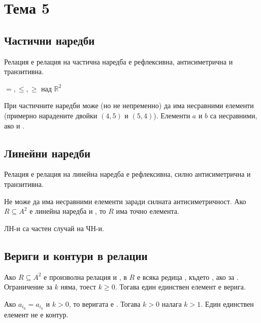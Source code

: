 \section{Тема 5} %

\subsection{Частични наредби}
\begin{definition}
    Релация е релация на частична наредба \totw е рефлексивна, антисиметрична и транзитивна.
\end{definition}

\begin{example}
    \(=, \le, \ge\) над \(\mathbb{R}^2\)
\end{example}

При частичните наредби може (но не непременно) да има несравними елементи (примерно нарадените двойки 
\((4, 5)\) и \((5, 4)\)). Елементи \(a\) и \(b\) са несравними, ако  и .

\subsection{Линейни наредби}
\begin{definition}
    Релация е релация на линейна наредба \totw е рефлексивна, силно антисиметрична и транзитивна.
\end{definition}

Не може да има несравними елементи заради силната антисиметричност.
Ако \(R \subseteq A^2\) е линейна наредба и , то \(R\) има точно 
 елемента.

ЛН-и са частен случай на ЧН-и.

\subsection{Вериги и контури в релации}
Ако \(R \subseteq A^2\) е произволна релация и ,  в \(R\) е всяка
редица , където , ако 
 за . Ограничение за \(k\) няма, тоест \(k \ge 0\). 
Тогава един единствен елемент е верига.

Ако \(a_{i_0} = a_{i_k}\) и \(k > 0\), то веригата е . Тогава \(k > 0\) налага \(k > 1\). 
Един единствен елемент не е контур.

